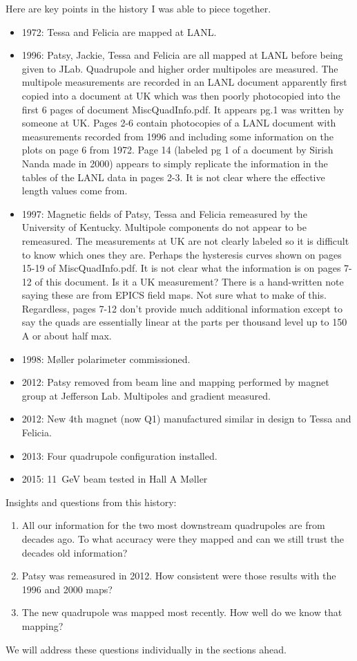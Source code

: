 \documentclass[12pt]{article}
\begin{document}
\FloatBarrier
 Here are key points in the history I was able to piece together.
\begin{itemize}
\item{1972: Tessa and Felicia are mapped at LANL.}
\item{1996: Patsy, Jackie, Tessa and Felicia are all mapped at LANL before being given to JLab. Quadrupole and higher order multipoles are measured. The multipole measurements are recorded in an LANL document apparently first copied into a document at UK which was then poorly photocopied into the first 6 pages of document MiscQuadInfo.pdf. It appears pg.1 was written by someone at UK. Pages 2-6 contain photocopies of a LANL document with measurements recorded from 1996 and including some information on the plots on page 6 from 1972. Page 14 (labeled pg 1 of a document by Sirish Nanda made in 2000) appears to simply replicate the information in the tables of the LANL data in pages 2-3. It is not clear where the effective length values come from.}
\item{1997: Magnetic fields of Patsy, Tessa and Felicia remeasured by the University of Kentucky. Multipole components do not appear to be remeasured. The measurements at UK are not clearly labeled so it is difficult to know which ones they are. Perhaps the hysteresis curves shown on pages 15-19 of MiscQuadInfo.pdf. It is not clear what the information is on pages 7-12 of this document. Is it a UK measurement? There is a hand-written note saying these are from EPICS field maps. Not sure what to make of this. Regardless, pages 7-12 don't provide much additional information except to say the quads are essentially linear at the parts per thousand level up to 150 A or about half max.}
\item{1998: M\o ller polarimeter commissioned.}
\item{2012: Patsy removed from beam line and mapping performed by magnet group at Jefferson Lab. Multipoles and gradient measured.}
\item{2012: New 4th magnet (now Q1) manufactured similar in design to Tessa and Felicia.}
\item{2013: Four quadrupole configuration installed.}
\item{2015: 11~GeV beam tested in Hall A M\o ller}
\end{itemize}

Insights and questions from this history:
\begin{enumerate}
\item{All our information for the two most downstream quadrupoles are from decades ago. To what accuracy were they mapped and can we still trust the decades old information?}
\item{Patsy was remeasured in 2012. How consistent were those results with the 1996 and 2000 maps?}
\item{The new quadrupole was mapped most recently. How well do we know that mapping?}
\end{enumerate}
We will address these questions individually in the sections ahead.
\end{document}
